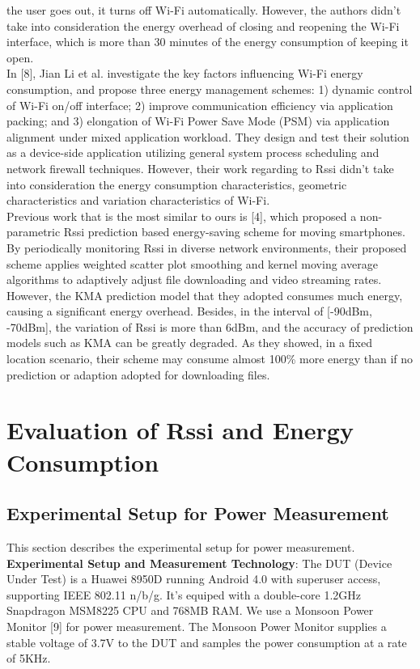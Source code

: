 \documentclass[journal]{IEEEtran}
\begin{document}
the user goes out, it turns off Wi-Fi automatically. 
However, the authors didn't take into consideration 
the energy overhead of closing and reopening the Wi-Fi interface, which is 
more than 30 minutes of the energy consumption of keeping it open.
\\
\indent
In [8], Jian Li et al. investigate the key
factors influencing Wi-Fi energy consumption, and propose three
energy management schemes: 1) dynamic control of Wi-Fi on/off
interface; 2) improve communication efficiency via application
packing; and 3) elongation of Wi-Fi Power Save Mode (PSM)
via application alignment under mixed application workload.
They design and test their solution as a device-side application
utilizing general system process scheduling and network firewall
techniques. However, their work regarding to Rssi didn't take 
into consideration the energy consumption characteristics, 
geometric characteristics and variation characteristics of Wi-Fi.
\\
\indent
Previous work that is the most similar to ours is [4], which proposed a non-parametric Rssi prediction 
based energy-saving scheme for moving smartphones. 
By periodically monitoring Rssi in diverse network environments, 
their proposed scheme applies weighted scatter plot smoothing and kernel
moving average algorithms to adaptively adjust file downloading and video streaming rates.
However, the KMA prediction model  
that they adopted consumes much energy, causing a significant energy overhead. Besides, 
in the interval of [-90dBm, -70dBm], the variation of Rssi is more than 6dBm, and the accuracy of prediction models such as KMA 
can be greatly degraded. As they showed, in a fixed location scenario, 
their scheme may consume almost 100\% more energy than if no prediction or adaption adopted for downloading files.
\section{Evaluation of Rssi and Energy Consumption}

\subsection{Experimental Setup for Power Measurement}
This section describes the experimental setup for power measurement. 
\\
\indent
{\bf Experimental Setup and Measurement Technology}: The DUT (Device Under Test) 
is a Huawei 8950D running Android 4.0 with superuser access, supporting IEEE 802.11 n/b/g. It's 
equiped with a double-core 1.2GHz Snapdragon MSM8225 CPU and 768MB RAM. We use a Monsoon Power Monitor [9] for power measurement.
The Monsoon Power Monitor supplies a stable voltage of 3.7V to the DUT and samples the power consumption at a rate of 5KHz. 
\end{document}
